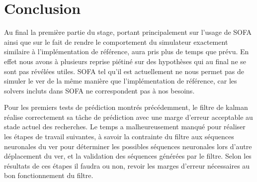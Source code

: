 \chapter{Conclusion} %
\label{cha:Conclusion}

Au final la première partie du stage, portant principalement sur l'usage de
SOFA ainsi que sur le fait de rendre le comportement du simulateur exactement similaire à
l'implémentation de référence, aura pris plus de temps que prévu. En effet
nous avons à plusieurs reprise piétiné sur des hypothèses qui au final ne se sont pas
révélées utiles. SOFA tel qu'il est actuellement ne nous permet pas de simuler
le ver de la même manière que l'implémentation de référence, car les solvers incluts dans SOFA ne correspondent pas
à nos besoins. 

Pour les premiers tests de prédiction montrés précédemment, le filtre de kalman
réalise correctement sa tâche de prédiction avec une marge d'erreur acceptable
au stade actuel des recherches. Le temps a malheureusement manqué pour réaliser
les étapes de travail suivantes, à savoir la contrainte du filtre aux séquences
neuronales du ver pour déterminer les possibles séquences neuronales lors d'autre
déplacement du ver, et la validation des séquences générées par le filtre.
Selon les résultats de ces étapes il faudra ou non, revoir les marges d'erreur
nécessaires au bon fonctionnement du filtre.

